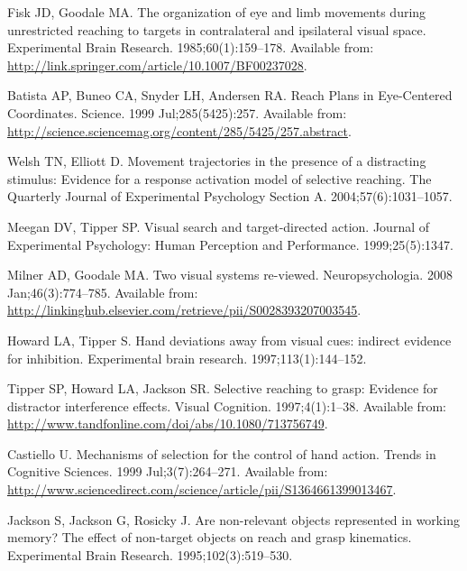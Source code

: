 \documentclass[10pt,letterpaper]{article}
\begin{document}
\begin{thebibliography}{10}
Fisk JD, Goodale MA.
\newblock The organization of eye and limb movements during unrestricted
  reaching to targets in contralateral and ipsilateral visual space.
\newblock Experimental Brain Research. 1985;60(1):159--178.
\newblock Available from:
  \url{http://link.springer.com/article/10.1007/BF00237028}.

Batista AP, Buneo CA, Snyder LH, Andersen RA.
\newblock Reach {Plans} in {Eye}-{Centered} {Coordinates}.
\newblock Science. 1999 Jul;285(5425):257.
\newblock Available from:
  \url{http://science.sciencemag.org/content/285/5425/257.abstract}.

Welsh TN, Elliott D.
\newblock Movement trajectories in the presence of a distracting stimulus:
  {Evidence} for a response activation model of selective reaching.
\newblock The Quarterly Journal of Experimental Psychology Section A.
  2004;57(6):1031--1057.

Meegan DV, Tipper SP.
\newblock Visual search and target-directed action.
\newblock Journal of Experimental Psychology: Human Perception and Performance.
  1999;25(5):1347.

Milner AD, Goodale MA.
\newblock Two visual systems re-viewed.
\newblock Neuropsychologia. 2008 Jan;46(3):774--785.
\newblock Available from:
  \url{http://linkinghub.elsevier.com/retrieve/pii/S0028393207003545}.

Howard LA, Tipper S.
\newblock Hand deviations away from visual cues: indirect evidence for
  inhibition.
\newblock Experimental brain research. 1997;113(1):144--152.

Tipper SP, Howard LA, Jackson SR.
\newblock Selective reaching to grasp: {Evidence} for distractor interference
  effects.
\newblock Visual Cognition. 1997;4(1):1--38.
\newblock Available from:
  \url{http://www.tandfonline.com/doi/abs/10.1080/713756749}.

Castiello U.
\newblock Mechanisms of selection for the control of hand action.
\newblock Trends in Cognitive Sciences. 1999 Jul;3(7):264--271.
\newblock Available from:
  \url{http://www.sciencedirect.com/science/article/pii/S1364661399013467}.

Jackson S, Jackson G, Rosicky J.
\newblock Are non-relevant objects represented in working memory? {The} effect
  of non-target objects on reach and grasp kinematics.
\newblock Experimental Brain Research. 1995;102(3):519--530.


\end{thebibliography}
\end{document}
